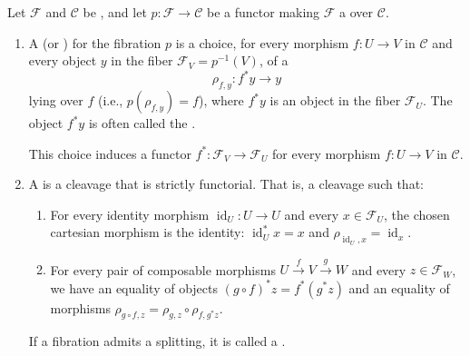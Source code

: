 \begin{definition}
\label{definition:cleavage_splitting_for_a_category_fibered_in_groupoids}
Let $\mathcal{F}$ and $\mathcal{C}$ be , and let $p: \mathcal{F} \to \mathcal{C}$ be a functor making $\mathcal{F}$ a  over $\mathcal{C}$.

\begin{enumerate}
    \item A  (or ) for the fibration $p$ is a choice, for every morphism $f: U \to V$ in $\mathcal{C}$ and every object $y$ in the fiber $\mathcal{F}_V = p^{-1}(V)$, of a 
    $$ \rho_{f,y}: f^*y \to y $$
    lying over $f$ (i.e., $p(\rho_{f,y}) = f$), where $f^*y$ is an object in the fiber $\mathcal{F}_U$. The object $f^*y$ is often called the .

    This choice induces a functor $f^*: \mathcal{F}_V \to \mathcal{F}_U$ for every morphism $f: U \to V$ in $\mathcal{C}$.


    \item A  is a cleavage that is strictly functorial. That is, a cleavage such that:
    \begin{enumerate}
        \item For every identity morphism $\operatorname{id}_U: U \to U$ and every $x \in \mathcal{F}_U$, the chosen cartesian morphism is the identity: $\operatorname{id}_U^* x = x$ and $\rho_{\operatorname{id}_U, x} = \operatorname{id}_x$.
        \item For every pair of composable morphisms $U \xrightarrow{f} V \xrightarrow{g} W$ and every $z \in \mathcal{F}_W$, we have an equality of objects $(g \circ f)^* z = f^*(g^* z)$ and an equality of morphisms $\rho_{g \circ f, z} = \rho_{g, z} \circ \rho_{f, g^*z}$.
    \end{enumerate}
    If a fibration admits a splitting, it is called a .
\end{enumerate}
\end{definition}